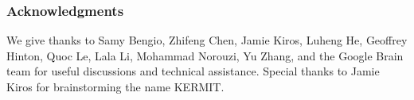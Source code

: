 \documentclass{article}
\begin{document}
\subsubsection*{Acknowledgments}
We give thanks to Samy Bengio, Zhifeng Chen, Jamie Kiros, Luheng He, Geoffrey Hinton, Quoc Le, Lala Li, Mohammad Norouzi, Yu Zhang, and the Google Brain team for useful discussions and technical assistance. Special thanks to Jamie Kiros for brainstorming the name KERMIT.





\end{document}
